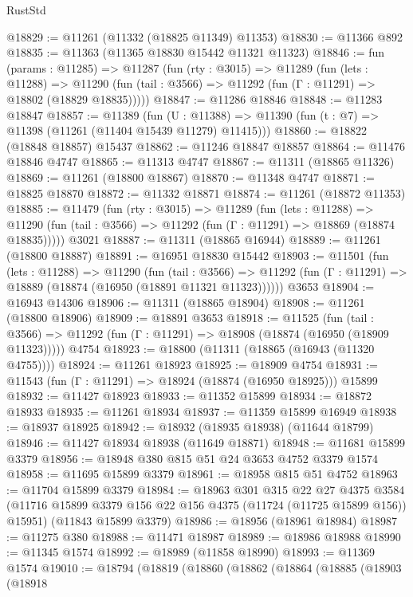 \begin{lexlean}{RustStd}
\begin{coremodule}
@18829 := @11261 (@11332 (@18825 @11349) @11353)
@18830 := @11366 @892
@18835 := @11363 (@11365 @18830 @15442 @11321 @11323)
@18846 := fun (params : @11285) =>
  @11287
    (fun (rty : @3015) =>
    @11289
      (fun (lets : @11288) =>
      @11290 (fun (tail : @3566) => @11292 (fun (Γ : @11291) => @18802 (@18829 @18835)))))
@18847 := @11286 @18846
@18848 := @11283 @18847
@18857 := @11389
    (fun (U : @11388) => @11390 (fun (t : @7) => @11398 (@11261 (@11404 @15439 @11279) @11415)))
@18860 := @18822 (@18848 @18857) @15437
@18862 := @11246 @18847 @18857
@18864 := @11476 @18846 @4747
@18865 := @11313 @4747
@18867 := @11311 (@18865 @11326)
@18869 := @11261 (@18800 @18867)
@18870 := @11348 @4747
@18871 := @18825 @18870
@18872 := @11332 @18871
@18874 := @11261 (@18872 @11353)
@18885 := @11479
    (fun (rty : @3015) =>
    @11289
      (fun (lets : @11288) =>
      @11290 (fun (tail : @3566) => @11292 (fun (Γ : @11291) => @18869 (@18874 @18835)))))
    @3021
@18887 := @11311 (@18865 @16944)
@18889 := @11261 (@18800 @18887)
@18891 := @16951 @18830 @15442
@18903 := @11501
    (fun (lets : @11288) =>
    @11290
      (fun (tail : @3566) =>
      @11292 (fun (Γ : @11291) => @18889 (@18874 (@16950 (@18891 @11321 @11323))))))
    @3653
@18904 := @16943 @14306
@18906 := @11311 (@18865 @18904)
@18908 := @11261 (@18800 @18906)
@18909 := @18891 @3653
@18918 := @11525
    (fun (tail : @3566) => @11292 (fun (Γ : @11291) => @18908 (@18874 (@16950 (@18909 @11323)))))
    @4754
@18923 := @18800 (@11311 (@18865 (@16943 (@11320 @4755))))
@18924 := @11261 @18923
@18925 := @18909 @4754
@18931 := @11543 (fun (Γ : @11291) => @18924 (@18874 (@16950 @18925))) @15899
@18932 := @11427 @18923
@18933 := @11352 @15899
@18934 := @18872 @18933
@18935 := @11261 @18934
@18937 := @11359 @15899 @16949
@18938 := @18937 @18925
@18942 := @18932 (@18935 @18938) (@11644 @18799)
@18946 := @11427 @18934 @18938 (@11649 @18871)
@18948 := @11681 @15899 @3379
@18956 := @18948 @380 @815 @51 @24 @3653 @4752 @3379 @1574
@18958 := @11695 @15899 @3379
@18961 := @18958 @815 @51 @4752
@18963 := @11704 @15899 @3379
@18984 := @18963
    @301
    @315
    @22
    @27
    @4375
    @3584
    (@11716 @15899 @3379 @156 @22 @156 @4375 (@11724 (@11725 @15899 @156)) @15951)
    (@11843 @15899 @3379)
@18986 := @18956 (@18961 @18984)
@18987 := @11275 @380
@18988 := @11471 @18987
@18989 := @18986 @18988
@18990 := @11345 @1574
@18992 := @18989 (@11858 @18990)
@18993 := @11369 @1574
@19010 := @18794
    (@18819
      (@18860
        (@18862
          (@18864
            (@18885
              (@18903
                (@18918

\end{coremodule}
\end{lexlean}
